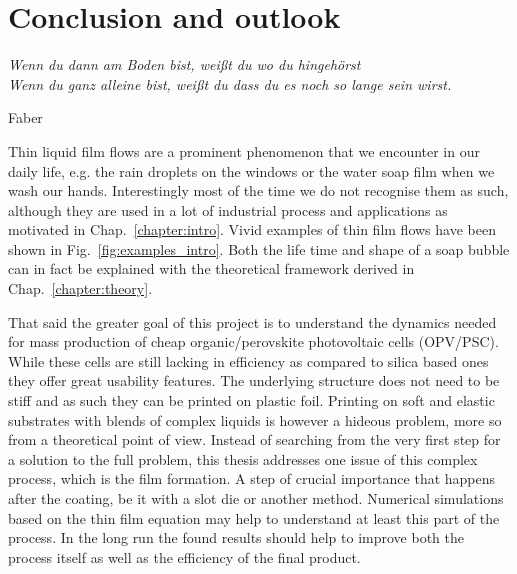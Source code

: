 \chapter{Conclusion and outlook}
\label{chapter:conclusion}
\epigraph{\textit{Wenn du dann am Boden bist, weißt du wo du hingehörst\\ Wenn du ganz alleine bist, weißt du dass du es noch so lange sein wirst.}}{Faber}

Thin liquid film flows are a prominent phenomenon that we encounter in our daily life, e.g. the rain droplets on the windows or the water soap film when we wash our hands.
Interestingly most of the time we do not recognise them as such, although they are used in a lot of industrial process and applications as motivated in Chap.~\ref{chapter:intro}.
Vivid examples of thin film flows have been shown in Fig.~\ref{fig:examples_intro}. 
Both the life time and shape of a soap bubble can in fact be explained with the theoretical framework derived in Chap.~\ref{chapter:theory}.

That said the greater goal of this project is to understand the dynamics needed for mass production of cheap organic/perovskite photovoltaic cells (OPV/PSC).
While these cells are still lacking in efficiency as compared to silica based ones they offer great usability features.
The underlying structure does not need to be stiff and as such they can be printed on plastic foil.
Printing on soft and elastic substrates with blends of complex liquids is however a hideous problem, more so from a theoretical point of view.
Instead of searching from the very first step for a solution to the full problem, this thesis addresses one issue of this complex process, which is the film formation.
A step of crucial importance that happens after the coating, be it with a slot die or another method.
Numerical simulations based on the thin film equation may help to understand at least this part of the process.
In the long run the found results should help to improve both the process itself as well as the efficiency of the final product.

